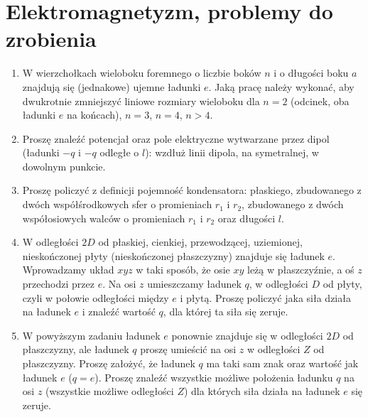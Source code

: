 \documentclass[a4paper,11pt]{article}
\begin{document}
\section{Elektromagnetyzm, problemy do zrobienia}





\begin{enumerate}

\item W wierzchołkach wieloboku foremnego o liczbie boków $n$ i o
  długości boku $a$ znajdują się (jednakowe) ujemne ładunki $e$. Jaką
  pracę należy wykonać, aby dwukrotnie zmniejszyć liniowe rozmiary
  wieloboku dla $n = 2$ (odcinek, oba ładunki $e$ na końcach),
  $n = 3$, $n = 4$, $n > 4$.

\item Proszę znaleźć potencjał oraz pole elektryczne wytwarzane przez
  dipol (ładunki $-q$ i $-q$ odległe o $l$): wzdłuż linii dipola, na
  symetralnej, w dowolnym punkcie.

\item Proszę policzyć z definicji pojemność kondensatora: płaskiego,
  zbudowanego z dwóch współśrodkowych sfer o promieniach $r_{ 1 }$ i
  $r_{ 2 }$, zbudowanego z dwóch współosiowych walców o promieniach
  $r_{ 1 }$ i $r_{ 2 }$ oraz długości $l$.

\item W odległości $2D$ od płaskiej, cienkiej, przewodzącej,
  uziemionej, nieskończonej płyty (nieskończonej płaszczyzny) znajduje
  się ładunek $e$. Wprowadzamy układ $xyz$ w taki sposób, że osie $xy$
  leżą w płaszczyźnie, a oś $z$ przechodzi przez $e$. Na osi $z$
  umieszczamy ładunek $q$, w odległości $D$ od płyty, czyli w połowie
  odległości między $e$ i płytą. Proszę policzyć jaka siła działa na
  ładunek $e$ i znaleźć wartość $q$, dla której ta siła się zeruje.

\item W powyższym zadaniu ładunek $e$ ponownie znajduje się w
  odległości $2D$ od płaszczyzny, ale ładunek $q$ proszę umieścić na
  osi $z$ w odległości $Z$ od płaszczyzny. Proszę założyć, że ładunek
  $q$ ma taki sam znak oraz wartość jak ładunek $e$ ($q = e$). Proszę
  znaleźć wszystkie możliwe położenia ładunku $q$ na osi $z$
  (wszystkie możliwe odległości $Z$) dla których siła działa na
  ładunek $e$ się zeruje.


\end{enumerate}
\end{document}

